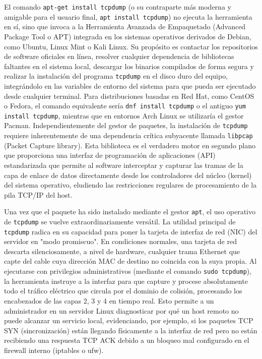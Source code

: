 \documentclass[a4paper,12pt]{article}
\begin{document}
El comando \texttt{apt-get install tcpdump} (o su contraparte más moderna y amigable para el usuario final, \texttt{apt install tcpdump}) no ejecuta la herramienta en sí, sino que invoca a la Herramienta Avanzada de Empaquetado (Advanced Package Tool o APT) integrada en los sistemas operativos derivados de Debian, como Ubuntu, Linux Mint o Kali Linux. Su propósito es contactar los repositorios de software oficiales en línea, resolver cualquier dependencia de bibliotecas faltantes en el sistema local, descargar los binarios compilados de forma segura y realizar la instalación del programa \texttt{tcpdump} en el disco duro del equipo, integrándolo en las variables de entorno del sistema para que pueda ser ejecutado desde cualquier terminal. Para distribuciones basadas en Red Hat, como CentOS o Fedora, el comando equivalente sería \texttt{dnf install tcpdump} o el antiguo \texttt{yum install tcpdump}, mientras que en entornos Arch Linux se utilizaría el gestor Pacman. Independientemente del gestor de paquetes, la instalación de \texttt{tcpdump} requiere inherentemente de una dependencia crítica subyacente llamada \texttt{libpcap} (Packet Capture library). Esta biblioteca es el verdadero motor en segundo plano que proporciona una interfaz de programación de aplicaciones (API) estandarizada que permite al software interceptar y capturar las tramas de la capa de enlace de datos directamente desde los controladores del núcleo (kernel) del sistema operativo, eludiendo las restricciones regulares de procesamiento de la pila TCP/IP del host.

Una vez que el paquete ha sido instalado mediante el gestor \texttt{apt}, el uso operativo de \texttt{tcpdump} se vuelve extraordinariamente versátil. La utilidad principal de \texttt{tcpdump} radica en su capacidad para poner la tarjeta de interfaz de red (NIC) del servidor en "modo promiscuo". En condiciones normales, una tarjeta de red descarta silenciosamente, a nivel de hardware, cualquier trama Ethernet que capte del cable cuya dirección MAC de destino no coincida con la suya propia. Al ejecutarse con privilegios administrativos (mediante el comando \texttt{sudo tcpdump}), la herramienta instruye a la interfaz para que capture y procese absolutamente todo el tráfico eléctrico que circula por el dominio de colisión, procesando los encabezados de las capas 2, 3 y 4 en tiempo real. Esto permite a un administrador en un servidor Linux diagnosticar por qué un host remoto no puede alcanzar un servicio local, evidenciando, por ejemplo, si los paquetes TCP SYN (sincronización) están llegando físicamente a la interfaz de red pero no están recibiendo una respuesta TCP ACK debido a un bloqueo mal configurado en el firewall interno (iptables o ufw).
\end{document}

